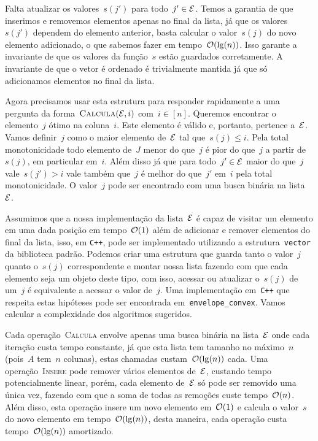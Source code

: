 Falta atualizar os valores~$s(j')$ para todo~$j' \in \mathcal{E}$. Temos a garantia de que inserimos e removemos elementos apenas no final da lista, já que os valores~$s(j')$ dependem do elemento anterior, basta calcular o valor~$s(j)$ do novo elemento adicionado, o que sabemos fazer em tempo~$\mathcal{O}(\lg(n))$. Isso garante a invariante de que os valores da função~$s$ estão guardados corretamente. A invariante de que o vetor é ordenado é trivialmente mantida já que só adicionamos elementos no final da lista.

Agora precisamos usar esta estrutura para responder rapidamente a uma pergunta da forma~${ \textsc{Calcula}(\mathcal{E},i) }$ com~$i \in [n]$. Queremos encontrar o elemento~$j$ ótimo na coluna~$i$. Este elemento é válido e, portanto, pertence a~$\mathcal{E}$. Vamos definir~$j$ como o maior elemento de~$\mathcal{E}$ tal que~$s(j) \leq i$. Pela total monotonicidade todo elemento de~$J$ menor do que~$j$ é pior do que~$j$ a partir de~$s(j)$, em particular em~$i$. Além disso já que para todo~$j' \in \mathcal{E}$ maior do que~$j$ vale~$s(j') > i$ vale também que~$j$ é melhor do que~$j'$ em~$i$ pela total monotonicidade. O valor~$j$ pode ser encontrado com uma busca binária na lista~$\mathcal{E}$.

Assumimos que a nossa implementação da lista~$\mathcal{E}$ é capaz de visitar um elemento em uma dada posição em tempo~$\mathcal{O}(1)$ além de adicionar e remover elementos do final da lista, isso, em \texttt{C++}, pode ser implementado utilizando a estrutura~\texttt{vector} da biblioteca padrão. Podemos criar uma estrutura que guarda tanto o valor~$j$ quanto o~$s(j)$ correspondente e montar nossa lista fazendo com que cada elemento seja um objeto deste tipo, com isso, acessar ou atualizar o~$s(j)$ de um~$j$ é equivalente a acessar o valor de~$j$. Uma implementação em~\texttt{C++} que respeita estas hipóteses pode ser encontrada em~\texttt{envelope\_convex}. Vamos calcular a complexidade dos algoritmos sugeridos.

Cada operação~\textsc{Calcula} envolve apenas uma busca binária na lista~$\mathcal{E}$ onde cada iteração custa tempo constante, já que esta lista tem tamanho no máximo~$n$ (pois~$A$ tem~$n$ colunas), estas chamadas custam~$\mathcal{O}(\lg(n))$ cada. Uma operação~\textsc{Insere} pode remover vários elementos de~$\mathcal{E}$, custando tempo potencialmente linear, porém, cada elemento de~$\mathcal{E}$ só pode ser removido uma única vez, fazendo com que a soma de todas as remoções custe tempo~$\mathcal{O}(n)$. Além disso, esta operação insere um novo elemento em~$\mathcal{O}(1)$ e calcula o valor~$s$ do novo elemento em tempo~$\mathcal{O}(\lg(n))$, desta maneira, cada operação custa tempo~$\mathcal{O}(\lg(n))$ amortizado.

